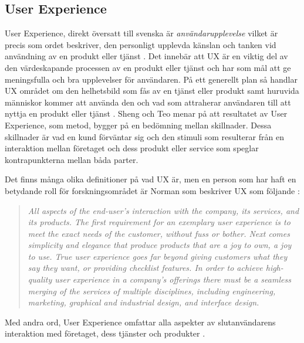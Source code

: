 \subsection{User Experience}
User Experience, direkt översatt till svenska är \textit{användarupplevelse} vilket är precis som ordet beskriver, den personligt upplevda känslan och tanken vid användning av en produkt eller tjänst \cite{Bargas-AvilaOldExperience}. Det innebär att UX är en viktig del av den värdeskapande processen av en produkt eller tjänst och har som mål att ge meningsfulla och bra upplevelser för användaren\cite{FlaveDesignprinciperMarknadsplats}. På ett generellt plan så handlar UX området om den helhetsbild som fås av en tjänst eller produkt samt huruvida människor kommer att använda den och vad som attraherar användaren till att nyttja en produkt eller tjänst \cite{Bargas-AvilaOldExperience}. Sheng och Teo \cite{Sheng2012ProductExperience} menar på att resultatet av User Experience, som metod, bygger på en bedömning mellan skillnader. Dessa skillnader är vad en kund förväntar sig och den stimuli som resulterar från en interaktion mellan företaget och dess produkt eller service som speglar kontrapunkterna mellan båda parter. 
\newline

Det finns många olika definitioner på vad UX är, men en person som har haft en betydande roll för forskningsområdet är Norman som beskriver UX som följande \cite{NormanTheUX}:
\newline
\begin{quote}
\em 
All aspects of the end-user’s interaction with the company, its services, and its products. The first requirement for an exemplary user experience is to meet the exact needs of the customer, without fuss or bother. Next comes simplicity and elegance that produce products that are a joy to own, a joy to use. True user experience goes far beyond giving customers what they say they want, or providing checklist features. In order to achieve high-quality user experience in a company’s offerings there must be a seamless merging of the services of multiple disciplines, including engineering, marketing, graphical and industrial design, and interface design. 
\newline
\end{quote} 

Med andra ord, User Experience omfattar alla aspekter av slutanvändarens interaktion med företaget, dess tjänster och produkter \cite{NormanTheUX}. 
\newline

